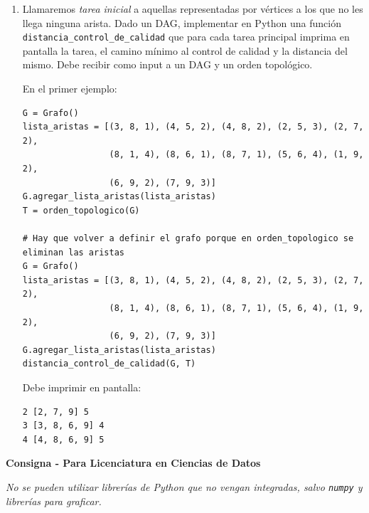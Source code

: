 \documentclass{article}
\begin{document}
\begin{enumerate}
Como no es un DAG, debe imprimir en pantalla:

\begin{verbatim}
El grafo no es un DAG
\end{verbatim}

\item Llamaremos \textit{tarea inicial} a aquellas representadas por vértices a los que no les llega ninguna arista. Dado un DAG, implementar en Python una función \texttt{distancia\_control\_de\_calidad} que para cada tarea principal imprima en pantalla la tarea, el camino mínimo al control de calidad y la distancia del mismo.
Debe recibir como input a un DAG y un orden topológico.

En el primer ejemplo:


\begin{verbatim}
G = Grafo()
lista_aristas = [(3, 8, 1), (4, 5, 2), (4, 8, 2), (2, 5, 3), (2, 7, 2),
                 (8, 1, 4), (8, 6, 1), (8, 7, 1), (5, 6, 4), (1, 9, 2), 
                 (6, 9, 2), (7, 9, 3)]
G.agregar_lista_aristas(lista_aristas)
T = orden_topologico(G)

# Hay que volver a definir el grafo porque en orden_topologico se eliminan las aristas
G = Grafo()
lista_aristas = [(3, 8, 1), (4, 5, 2), (4, 8, 2), (2, 5, 3), (2, 7, 2),
                 (8, 1, 4), (8, 6, 1), (8, 7, 1), (5, 6, 4), (1, 9, 2), 
                 (6, 9, 2), (7, 9, 3)]
G.agregar_lista_aristas(lista_aristas)
distancia_control_de_calidad(G, T)
\end{verbatim}

Debe imprimir en pantalla:
\begin{verbatim}
2 [2, 7, 9] 5
3 [3, 8, 6, 9] 4
4 [4, 8, 6, 9] 5
\end{verbatim}
\end{enumerate}

\newpage

\vspace*{\baselineskip}

\textbf{Consigna - Para Licenciatura en Ciencias de Datos}

\vspace*{\baselineskip}

\textit{No se pueden utilizar librerías de Python que no vengan integradas, salvo \texttt{numpy} y librerías para graficar.}
\end{document}
